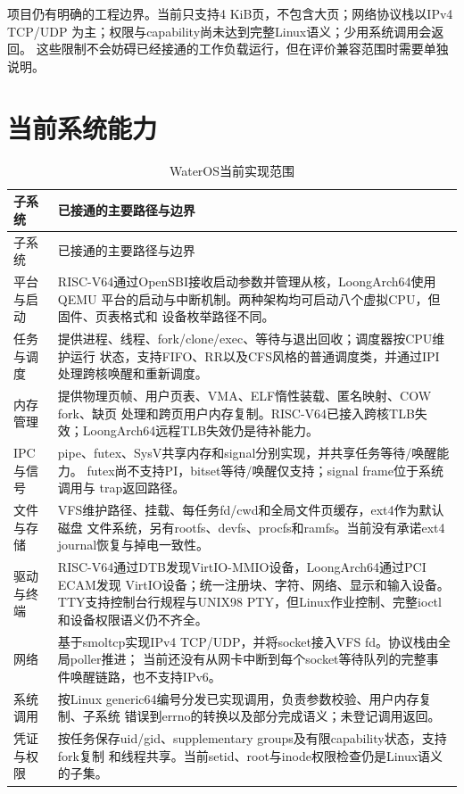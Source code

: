 项目仍有明确的工程边界。当前只支持4 KiB页，不包含大页；网络协议栈以IPv4 TCP/UDP
为主；权限与capability尚未达到完整Linux语义；少用系统调用会返回。
这些限制不会妨碍已经接通的工作负载运行，但在评价兼容范围时需要单独说明。

\section{当前系统能力}

\begin{longtable}{L{3.0cm}L{10.5cm}}
  \caption{WaterOS当前实现范围}\label{tab:current-summary}\\
  \toprule
  子系统 & 已接通的主要路径与边界 \\
  \midrule
  \endfirsthead
  \toprule
  子系统 & 已接通的主要路径与边界 \\
  \midrule
  \endhead
  平台与启动 & RISC-V64通过OpenSBI接收启动参数并管理从核，LoongArch64使用QEMU
  平台的启动与中断机制。两种架构均可启动八个虚拟CPU，但固件、页表格式和
  设备枚举路径不同。\\
  任务与调度 & 提供进程、线程、fork/clone/exec、等待与退出回收；调度器按CPU维护运行
  状态，支持FIFO、RR以及CFS风格的普通调度类，并通过IPI处理跨核唤醒和重新调度。\\
  内存管理 & 提供物理页帧、用户页表、VMA、ELF惰性装载、匿名映射、COW fork、缺页
  处理和跨页用户内存复制。RISC-V64已接入跨核TLB失效；LoongArch64远程TLB失效仍是待补能力。\\
  IPC与信号 & pipe、futex、SysV共享内存和signal分别实现，并共享任务等待/唤醒能力。
  futex尚不支持PI，bitset等待/唤醒仅支持；signal frame位于系统调用与
  trap返回路径。\\
  文件与存储 & VFS维护路径、挂载、每任务fd/cwd和全局文件页缓存，ext4作为默认磁盘
  文件系统，另有rootfs、devfs、procfs和ramfs。当前没有承诺ext4 journal恢复与掉电一致性。\\
  驱动与终端 & RISC-V64通过DTB发现VirtIO-MMIO设备，LoongArch64通过PCI ECAM发现
  VirtIO设备；统一注册块、字符、网络、显示和输入设备。TTY支持控制台行规程与UNIX98
  PTY，但Linux作业控制、完整ioctl和设备权限语义仍不齐全。\\
  网络 & 基于smoltcp实现IPv4 TCP/UDP，并将socket接入VFS fd。协议栈由全局poller推进；
  当前还没有从网卡中断到每个socket等待队列的完整事件唤醒链路，也不支持IPv6。\\
  系统调用 & 按Linux generic64编号分发已实现调用，负责参数校验、用户内存复制、子系统
  错误到errno的转换以及部分完成语义；未登记调用返回。\\
  凭证与权限 & 按任务保存uid/gid、supplementary groups及有限capability状态，支持fork复制
  和线程共享。当前setid、root与inode权限检查仍是Linux语义的子集。\\
  \bottomrule
\end{longtable}

